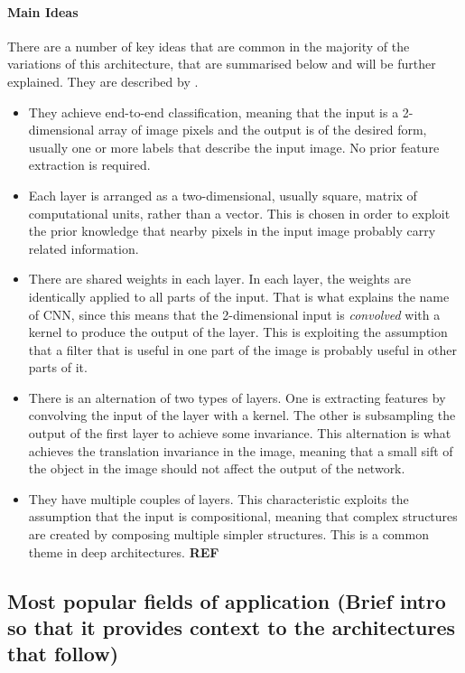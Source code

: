 \documentclass[a4paper]{report}
\begin{document}
		\paragraph{Main Ideas}			
		There are a number of key ideas that are common in the majority of the variations of this architecture, that are summarised below and will be further explained. They are described by \cite{LeCun1989,LeCun1990}.
		\begin{itemize}
			\item They achieve end-to-end classification, meaning that the input is a 2-dimensional array of image pixels and the output is of the desired form, usually one or more labels that describe the input image. No prior feature extraction is required.
			\item Each layer is arranged as a two-dimensional, usually square, matrix of computational units, rather than a vector. This is chosen in order to exploit the prior knowledge that nearby pixels in the input image probably carry related information.
			\item There are shared weights in each layer. In each layer, the weights are identically applied to all parts of the input. That is what explains the name of CNN, since this means that the 2-dimensional input is \textit{convolved} with a kernel to produce the output of the layer. This is exploiting the assumption that a filter that is useful in one part of the image is probably useful in other parts of it.
			\item There is an alternation of two types of layers. One is extracting features by convolving the input of the layer with a kernel. The other is subsampling the output of the first layer to achieve some invariance. This alternation is what achieves the translation invariance in the image, meaning that a small sift of the object in the image should not affect the output of the network.
			\item They have multiple couples of layers. This characteristic exploits the assumption that the input is compositional, meaning that complex structures are created by composing multiple simpler structures. This is a common theme in deep architectures. \textbf{REF}
		\end{itemize}	 
		
		
		
	\subsection{Most popular fields of application (Brief intro so that it provides context to the architectures that follow)}
\end{document}
